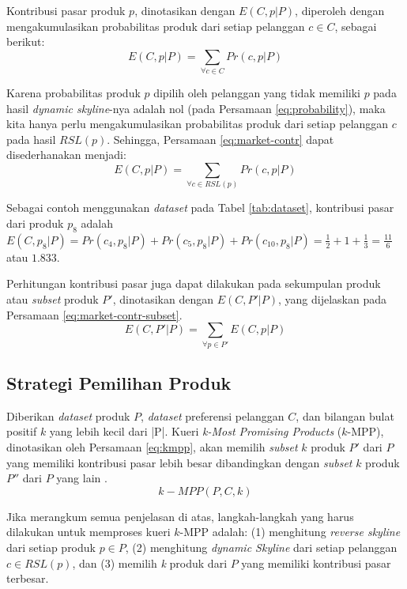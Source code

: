 Kontribusi pasar produk $p$, dinotasikan dengan $E(C, p|P)$, diperoleh dengan mengakumulasikan probabilitas produk dari setiap pelanggan $c \in C$, sebagai berikut:\\
\begin{equation}\label{eq:market-contr}
E(C, p|P) = \sum_{\forall c \in C} Pr(c, p|P)
\end{equation}

Karena probabilitas produk $p$ dipilih oleh pelanggan yang tidak memiliki $p$ pada hasil \textit{dynamic skyline}-nya adalah nol (pada Persamaan \ref{eq:probability}), maka kita hanya perlu mengakumulasikan probabilitas produk dari setiap pelanggan $c$ pada hasil $RSL(p)$. Sehingga, Persamaan \ref{eq:market-contr} dapat disederhanakan menjadi:
\begin{equation}\label{eq:market-contr-rsl}
E(C, p|P) = \sum_{\forall c \in RSL(p)} Pr(c, p|P)
\end{equation}

\pagebreak
Sebagai contoh menggunakan \textit{dataset} pada Tabel \ref{tab:dataset}, kontribusi pasar dari produk $p_8$ adalah $E(C, p_8|P) = Pr(c_4, p_8|P) + Pr(c_5, p_8|P) + Pr(c_{10}, p_8|P) = \frac{1}{2} + 1 + \frac{1}{3} = \frac{11}{6}$ atau $1.833$.

Perhitungan kontribusi pasar juga dapat dilakukan pada sekumpulan produk atau \textit{subset} produk $P'$, dinotasikan dengan $E(C, P'|P)$, yang dijelaskan pada Persamaan \ref{eq:market-contr-subset}.
\begin{equation}\label{eq:market-contr-subset}
E(C, P'|P) = \sum_{\forall p \in P'} E(C, p|P)
\end{equation}

\subsection{Strategi Pemilihan Produk}
\tab Diberikan \textit{dataset} produk $P$, \textit{dataset} preferensi pelanggan $C$, dan bilangan bulat positif $k$ yang lebih kecil dari |P|. Kueri \textit{k-Most Promising Products} ($k$-MPP), dinotasikan oleh Persamaan \ref{eq:kmpp}, akan memilih \textit{subset} $k$ produk $P'$ dari $P$ yang memiliki kontribusi pasar lebih besar dibandingkan dengan \textit{subset} $k$ produk $P''$ dari $P$ yang lain \cite{kmpp}.
\begin{equation}\label{eq:kmpp}
k-MPP(P, C, k)
\end{equation}

Jika merangkum semua penjelasan di atas, langkah-langkah yang harus dilakukan untuk memproses kueri $k$-MPP adalah: (1) menghitung \textit{reverse skyline} dari setiap produk $p \in P$, (2) menghitung \textit{dynamic Skyline} dari setiap pelanggan $c \in RSL(p)$, dan (3) memilih \textit{k} produk dari $P$ yang memiliki kontribusi pasar terbesar.

